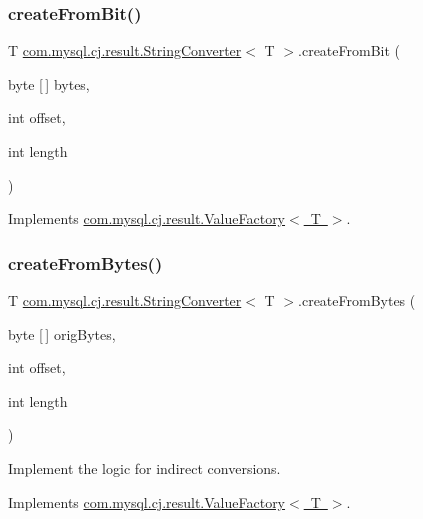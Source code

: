 \subsubsection{\texorpdfstring{create\+From\+Bit()}{createFromBit()}}
{\footnotesize\ttfamily T \mbox{\hyperlink{classcom_1_1mysql_1_1cj_1_1result_1_1_string_converter}{com.\+mysql.\+cj.\+result.\+String\+Converter}}$<$ T $>$.create\+From\+Bit (\begin{DoxyParamCaption}\item[{byte \mbox{[}$\,$\mbox{]}}]{bytes,  }\item[{int}]{offset,  }\item[{int}]{length }\end{DoxyParamCaption})}



Implements \mbox{\hyperlink{interfacecom_1_1mysql_1_1cj_1_1result_1_1_value_factory_a23ac617a66fbf713243dd67ab04d30e6}{com.\+mysql.\+cj.\+result.\+Value\+Factory$<$ T $>$}}.

\mbox{\label{classcom_1_1mysql_1_1cj_1_1result_1_1_string_converter_a62092d8d4f0919ee0c63e7b4caf29d5a}} 
\subsubsection{\texorpdfstring{create\+From\+Bytes()}{createFromBytes()}}
{\footnotesize\ttfamily T \mbox{\hyperlink{classcom_1_1mysql_1_1cj_1_1result_1_1_string_converter}{com.\+mysql.\+cj.\+result.\+String\+Converter}}$<$ T $>$.create\+From\+Bytes (\begin{DoxyParamCaption}\item[{byte \mbox{[}$\,$\mbox{]}}]{orig\+Bytes,  }\item[{int}]{offset,  }\item[{int}]{length }\end{DoxyParamCaption})}

Implement the logic for indirect conversions. 

Implements \mbox{\hyperlink{interfacecom_1_1mysql_1_1cj_1_1result_1_1_value_factory_a0724fcd13ef1ef07c781a61167847a11}{com.\+mysql.\+cj.\+result.\+Value\+Factory$<$ T $>$}}.

